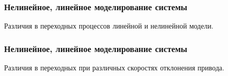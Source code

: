 \documentclass{beamer}
\begin{document}
\begin{frame}[t]
    \frametitle{Нелинейное, линейное моделирование системы}
\begin{center}
    Различия в переходных процессов линейной и нелинейной модели.
    \vspace{14pt}

        \begin{minipage}{0.45\textwidth}
            \begin{center}
            \resizebox{1.2\textwidth}{!}{}
            \end{center}
        \end{minipage}
        \hfill
        \begin{minipage}{0.45\textwidth}
            \begin{center}
                \resizebox{1.2\textwidth}{!}{}
            \end{center}
        \end{minipage}
\end{center}
\end{frame}


\begin{frame}[t]
    \frametitle{Нелинейное, линейное моделирование системы}
\begin{center}
    Различия в переходных при различных скоростях отклонения привода. 
    \vspace{14pt}

        \begin{minipage}{0.45\textwidth}
            \begin{center}
            \resizebox{1.2\textwidth}{!}{}
            \end{center}
        \end{minipage}
        \hfill
        \begin{minipage}{0.45\textwidth}
            \begin{center}
                \resizebox{1.2\textwidth}{!}{}
            \end{center}
        \end{minipage}
\end{center}
\end{frame}
\end{document}
